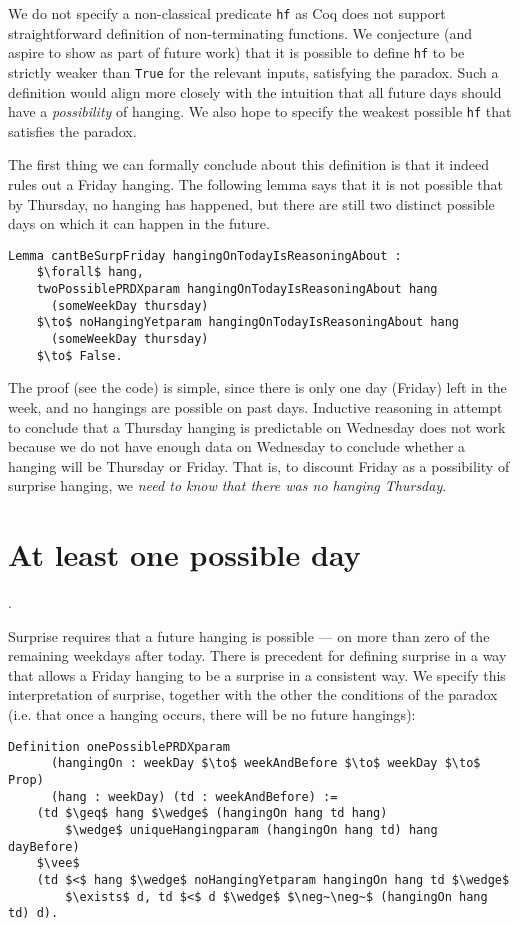 \documentclass[runningheads]{llncs}
\begin{document}
We do not specify a non-classical predicate {\tt hf} as Coq does not support
straightforward definition of non-terminating functions.
We conjecture (and aspire to show as part of future work) that it is possible to
define {\tt hf} to be strictly weaker than {\tt True} for the relevant inputs,
satisfying the paradox. Such a definition would align more closely with
the intuition that all future days should have a \emph{possibility} of hanging.
We also hope to specify the weakest possible {\tt hf} that satisfies the paradox.

The first thing we can formally conclude about this definition is that it indeed rules out
a Friday hanging. The following lemma says that it is not possible that by Thursday,
no hanging has happened, but there are still two distinct possible days on which it can
happen in the future.

\begin{lstlisting}[mathescape=true]
  Lemma cantBeSurpFriday hangingOnTodayIsReasoningAbout :
    $\forall$ hang,
    twoPossiblePRDXparam hangingOnTodayIsReasoningAbout hang
      (someWeekDay thursday)
    $\to$ noHangingYetparam hangingOnTodayIsReasoningAbout hang
      (someWeekDay thursday)
    $\to$ False.
\end{lstlisting}

The proof (see the code) is simple, since there is only one day (Friday) left in the week,
and no hangings are possible on past days.
Inductive reasoning in attempt to conclude that a Thursday hanging is
predictable on Wednesday does not work because we do not have enough data on Wednesday
to conclude whether a hanging will be Thursday or Friday. That is, to discount Friday
as a possibility of surprise hanging, we \emph{need to know that there was no
hanging Thursday}.

\section{At least one possible day}.
\label{sec:one}

Surprise requires that a future hanging is possible --- on more than zero
of the remaining weekdays after today. There is precedent \cite{fourpossible}
for defining surprise
in a way that allows a Friday hanging to be a surprise in a consistent way.
We specify this interpretation of surprise, together with the other the conditions
of the paradox (i.e. that once a hanging occurs, there will be no future hangings):

\begin{lstlisting}[mathescape=true]
  Definition onePossiblePRDXparam
      (hangingOn : weekDay $\to$ weekAndBefore $\to$ weekDay $\to$ Prop)
      (hang : weekDay) (td : weekAndBefore) :=
    (td $\geq$ hang $\wedge$ (hangingOn hang td hang)
        $\wedge$ uniqueHangingparam (hangingOn hang td) hang dayBefore)
    $\vee$
    (td $<$ hang $\wedge$ noHangingYetparam hangingOn hang td $\wedge$
        $\exists$ d, td $<$ d $\wedge$ $\neg~\neg~$ (hangingOn hang td) d).
\end{lstlisting}
\end{document}
